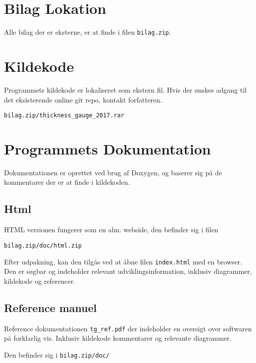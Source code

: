 \appendix
\section{Bilag Lokation}
Alle bilag der er eksterne, er at finde i filen \texttt{bilag.zip}.

\section{Kildekode}
Programmets kildekode er lokaliseret som ekstern fil.
Hvis der ønskes adgang til det eksisterende online git repo, kontakt forfatteren.

\texttt{bilag.zip/thickness\_gauge\_2017.rar}

\section{Programmets Dokumentation}

Dokumentationen er oprettet ved brug af Doxygen, og baserer sig på de kommentarer der er at finde i kildekoden.

\subsection{Html}

HTML versionen fungerer som en alm. webside, den befinder sig i filen

\texttt{bilag.zip/doc/html.zip}

Efter udpakning, kan den tilgås ved at åbne filen \texttt{index.html} med en browser.
Den er søgbar og indeholder relevant udviklingsinformation, inklusiv diagrammer, kildekode og referencer.

\subsection{Reference manuel}

Reference dokumentationen \texttt{tg\_ref.pdf} der indeholder en oversigt over softwaren på forklarlig vis. Inklusiv kildekode kommentarer og relevante diagrammer.

Den befinder sig i \texttt{bilag.zip/doc/}
